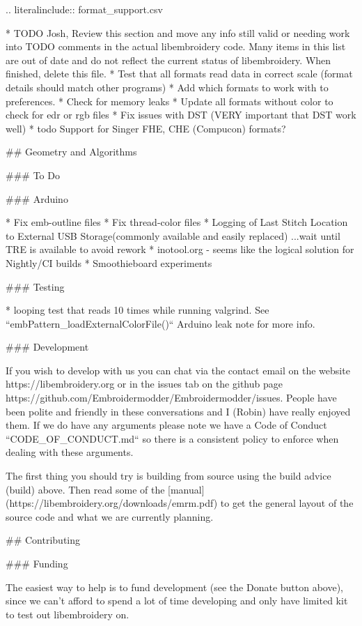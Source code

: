 .. literalinclude:: format\_support.csv

* TODO Josh, Review this section and move any info still valid or needing work into TODO comments in the actual libembroidery code. Many items in this list are out of date and do not reflect the current status of libembroidery. When finished, delete this file.
  * Test that all formats read data in correct scale (format details should match other programs)
  * Add which formats to work with to preferences.
  * Check for memory leaks
  * Update all formats without color to check for edr or rgb files
  * Fix issues with DST (VERY important that DST work well)
* todo Support for Singer FHE, CHE (Compucon) formats?

## Geometry and Algorithms

### To Do

### Arduino

* Fix emb-outline files
* Fix thread-color files
* Logging of Last Stitch Location to External USB Storage(commonly available and easily replaced) ...wait until TRE is available to avoid rework
* inotool.org - seems like the logical solution for Nightly/CI builds
* Smoothieboard experiments

### Testing

* looping test that reads 10 times while running valgrind. See ``embPattern\_loadExternalColorFile()`` Arduino leak note for more info.

### Development

If you wish to develop with us you can chat via the contact email
on the website https://libembroidery.org or in the issues tab on the
github page https://github.com/Embroidermodder/Embroidermodder/issues.
People have been polite and friendly in these conversations and I (Robin)
have really enjoyed them.
If we do have any arguments please note we have a
Code of Conduct ``CODE\_OF\_CONDUCT.md`` so there is a consistent policy to
enforce when dealing with these arguments.

The first thing you should try is building from source using the  build advice (build)
above. Then read some of the
[manual](https://libembroidery.org/downloads/emrm.pdf) to get the general
layout of the source code and what we are currently planning.

## Contributing

### Funding

The easiest way to help is to fund development (see the Donate button above),
since we can't afford to spend a lot of time developing and only have limited
kit to test out libembroidery on.

